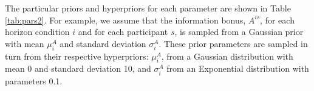 \documentclass[12pt]{article}
\begin{document}
	The particular priors and hyperpriors for each parameter are shown in Table \ref{tab:pars2}. For example, we assume that the information bonus, $A^{is}$, for each horizon condition $i$ and for each participant $s$, is sampled from a Gaussian prior with mean $\mu^{A}_{i}$ and standard deviation $\sigma_{i}^A$. These prior parameters are sampled in turn from their respective hyperpriors: $\mu_{i}^{A}$, from a Gaussian distribution with mean 0 and standard deviation 10, and $\sigma_{i}^A$ from an Exponential distribution with parameters 0.1.
	
\end{document}
